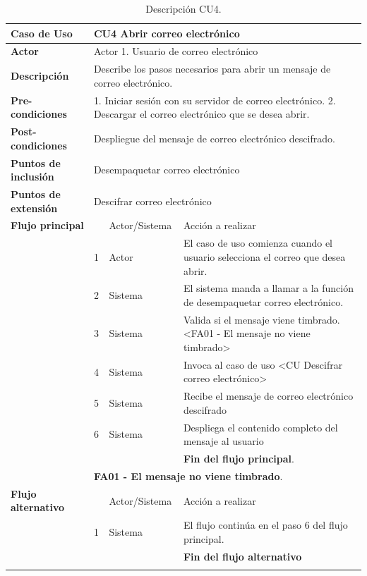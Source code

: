 \begin{longtable}[H]{| p{} | p{} |p{4cm}|p{5cm}|}
     \hline
     \textbf{Caso de Uso} &\multicolumn{3}{|l|}{CU4 Abrir correo electrónico}\\
     \hline
     \textbf{Actor} & \multicolumn{3}{|l|}{Actor 1. Usuario de correo electrónico}\\
     \hline
     \textbf{Descripción} & \multicolumn{3}{|p{10cm}|}{Describe los pasos necesarios para abrir un mensaje de correo electrónico.}\\
     \hline
     \textbf{Pre-condiciones} & \multicolumn{3}{|p{10cm}|}{1. Iniciar sesión con su servidor de correo electrónico. 2. Descargar el correo electrónico que se desea abrir.}\\
     \hline
     \textbf{Post-condiciones} & \multicolumn{3}{|l|}{Despliegue del mensaje de correo electrónico descifrado.}\\
     \hline
     \textbf{Puntos de inclusión} & \multicolumn{3}{|l|}{Desempaquetar correo electrónico}\\
     \hline
     \textbf{Puntos de extensión} & \multicolumn{3}{|l|}{Descifrar correo electrónico}\\
     \hline
     \textbf{Flujo principal} & & Actor/Sistema & Acción a realizar\\
     \hline
     & 1 & Actor & El caso de uso comienza cuando el usuario selecciona el correo que desea abrir.\\
     \hline
     & 2 & Sistema & El sistema manda a llamar a la función de desempaquetar correo electrónico.\\
     \hline
     & 3 & Sistema & Valida si el mensaje viene timbrado. <FA01 - El mensaje no viene timbrado>\\
     \hline
     & 4 & Sistema & Invoca al caso de uso <CU Descifrar correo electrónico>\\
     \hline
     & 5 & Sistema & Recibe el mensaje de correo electrónico descifrado\\
     \hline
     & 6 & Sistema & Despliega el contenido completo del mensaje al usuario\\
     \hline
     & & & \textbf{Fin del flujo principal}.\\
     \hline
     & \multicolumn{3}{|l|}{\textbf{FA01 - El mensaje no viene timbrado}.}\\
     \hline
     \textbf{Flujo alternativo} & & Actor/Sistema & Acción a realizar\\
     \hline
     & 1 & Sistema & El flujo continúa en el paso 6 del flujo principal.\\
     \hline
     &  & & \textbf{Fin del flujo alternativo}\\
     \hline
    \caption{Descripción CU4.}
    \label{tabla:CU4}
\end{longtable}



